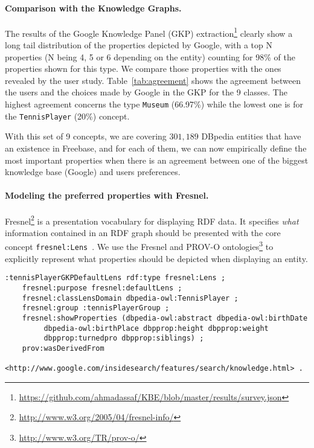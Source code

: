 \documentclass[runningheads,a4paper]{llncs}
\begin{document}
\paragraph{\textbf{Comparison with the Knowledge Graphs.}}
\label{sec:comparison}
The results of the Google Knowledge Panel (GKP) extraction\footnote{\url{https://github.com/ahmadassaf/KBE/blob/master/results/survey.json}} clearly show a long tail distribution of the properties depicted by Google, with a top N properties (N being 4, 5 or 6 depending on the entity) counting for 98\% of the properties shown for this type. We compare those properties with the ones revealed by the user study. Table~\ref{tab:agreement} shows the agreement between the users and the choices made by Google in the GKP for the 9 classes. The highest agreement concerns the type \texttt{Museum} (66.97\%) while the lowest one is for the \texttt{TennisPlayer} (20\%) concept.

\begin{table}[!htp]
\end{table}\normalsize
With this set of 9 concepts, we are covering $301,189$ DBpedia entities that have an existence in Freebase, and for each of them, we can now empirically define the most important properties when there is an agreement between one of the biggest knowledge base (Google) and users preferences.

\paragraph{\textbf{Modeling the preferred properties with Fresnel.}}
\label{sec:fresnel}
Fresnel\footnote{\url{http://www.w3.org/2005/04/fresnel-info/}} is a presentation vocabulary for displaying RDF data. It specifies \textit{what} information contained in an RDF graph should be presented with the core concept \texttt{fresnel:Lens}~\cite{pietriga2006}. We use the Fresnel and PROV-O ontologies\footnote{\url{http://www.w3.org/TR/prov-o/}} to explicitly represent what properties should be depicted when displaying an entity.
\scriptsize
\begin{verbatim}
:tennisPlayerGKPDefaultLens rdf:type fresnel:Lens ;
	fresnel:purpose fresnel:defaultLens ;
	fresnel:classLensDomain dbpedia-owl:TennisPlayer ;
	fresnel:group :tennisPlayerGroup ;
	fresnel:showProperties (dbpedia-owl:abstract dbpedia-owl:birthDate
		 dbpedia-owl:birthPlace dbpprop:height dbpprop:weight
		 dbpprop:turnedpro dbpprop:siblings) ;
	prov:wasDerivedFrom
	  <http://www.google.com/insidesearch/features/search/knowledge.html> .		
\end{verbatim}	
\normalsize
\end{document}
